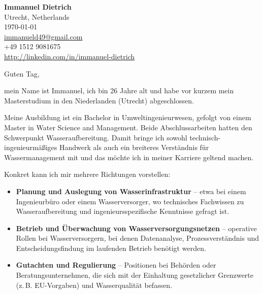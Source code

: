 \documentclass[11pt]{report}
\begin{document}
 
\begin{titlepage}

    \begin{minipage}[t]{0.95\textwidth}
        \hfill
        \raggedleft
        \textbf{Immanuel Dietrich} \\
        Utrecht, Netherlands \\
        \today\\
        \href{mailto:immanueld49@gmail.com}{immanueld49@gmail.com} \\
        +49 1512 9081675 \\
        \url{http://linkedin.com/in/immanuel-dietrich}
    \end{minipage}

\vspace{0.7em}

\raggedright Guten Tag,\\


\vspace{0.7em}

mein Name ist Immanuel, ich bin 26 Jahre alt und habe vor kurzem mein Masterstudium in den Niederlanden (Utrecht) abgeschlossen. 
 
\vspace{0.7em}


Meine Ausbildung ist ein Bachelor in Umweltingenieurwesen, gefolgt von einem Master in Water Science and Management. Beide Abschlussarbeiten hatten den Schwerpunkt Wasseraufbereitung. 
Damit bringe ich sowohl technisch-ingenieurmäßiges Handwerk als auch ein breiteres Verständnis für Wassermanagement mit und das möchte ich in meiner Karriere geltend machen.

\vspace{0.7em}
 
Konkret kann ich mir mehrere Richtungen vorstellen:
 
\vspace{0.3em}
 
\begin{itemize}
    \item \textbf{Planung und Auslegung von Wasserinfrastruktur} -- etwa bei einem Ingenieurbüro oder einem Wasserversorger, wo technisches Fachwissen zu Wasseraufbereitung und ingenieursspezifische Kenntnisse gefragt ist.
    \item \textbf{Betrieb und Überwachung von Wasserversorgungsnetzen} -- operative Rollen bei Wasserversorgern, bei denen Datenanalyse, Prozessverständnis und Entscheidungsfindung im laufenden Betrieb benötigt werden.
    \item \textbf{Gutachten und Regulierung} -- Positionen bei Behörden oder Beratungsunternehmen, die sich mit der Einhaltung gesetzlicher Grenzwerte (z.\,B. EU-Vorgaben) und Wasserqualität befassen.
\end{itemize}
 

\end{titlepage}
\end{document}
